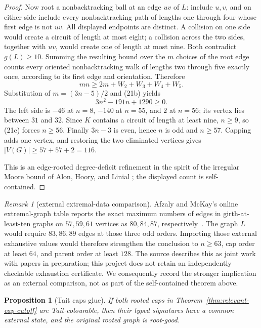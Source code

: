 \documentclass[11pt]{article}
\newtheorem{proposition}[theorem]{Proposition}
\theoremstyle{definition}
\theoremstyle{remark}
\newtheorem{remark}[theorem]{Remark}
\begin{document}
\begin{proof}
Now root a nonbacktracking ball at an edge $uv$ of $L$: include $u,v$,
and on either side include every nonbacktracking path of lengths one
through four whose first edge is not $uv$.  All displayed endpoints are
distinct.  A collision on one side would create a circuit of length at
most eight; a collision across the two sides, together with $uv$, would
create one of length at most nine.  Both contradict $g(L)\geq10$.
Summing the resulting bound over the $m$ choices of the root edge counts
every oriented nonbacktracking walk of lengths two through five exactly
once, according to its first edge and orientation.  Therefore
\[
                         mn\geq2m+W_2+W_3+W_4+W_5.
\]
Substitution of $m=(3n-5)/2$ and (21b) yields
\[
                         3n^2-191n+1290\geq0.              \tag{21c}
\]
The left side is $-46$ at $n=8$, $-140$ at $n=55$, and $2$ at
$n=56$; its vertex lies between $31$ and $32$.  Since $K$ contains a
circuit of length at least nine, $n\geq9$, so (21c) forces $n\geq56$.
Finally $3n-3$ is even, hence $n$ is odd and $n\geq57$.  Capping adds one
vertex, and restoring the two eliminated vertices gives
$|V(G)|\geq57+57+2=116$.

This is an edge-rooted degree-deficit refinement in the spirit of the
irregular Moore bound of Alon, Hoory, and Linial
\cite{AlonHooryLinial2002}; the displayed count is self-contained.
\end{proof}

\begin{remark}[external extremal-data comparison]
Afzaly and McKay's online extremal-graph table reports the exact maximum
numbers of edges in girth-at-least-ten graphs on $57,59,61$ vertices as
$80,84,87$, respectively~\cite{AfzalyMcKayExtremalData}.  The graph $L$
would require $83,86,89$ edges at those three odd orders.  Importing those
external exhaustive values would therefore strengthen the conclusion to
$n\geq63$, cap order at least $64$, and parent order at least $128$.
The source describes this as joint work with papers in preparation; this
project does not retain an independently checkable exhaustion certificate.
We consequently record the stronger implication as an external comparison,
not as part of the self-contained theorem above.
\end{remark}

\begin{proposition}[Tait caps glue]\label{prop:tait-caps-glue}
If both rooted caps in Theorem~\ref{thm:relevant-cap-cutoff} are
Tait-colourable, then their typed signatures have a common external state,
and the original rooted graph is root-good.
\end{proposition}
\end{document}
